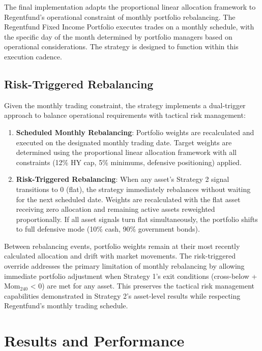 \documentclass[11pt, letterpaper]{article}
\begin{document}
The final implementation adapts the proportional linear allocation framework to Regentfund's operational constraint of monthly portfolio rebalancing. The Regentfund Fixed Income Portfolio executes trades on a monthly schedule, with the specific day of the month determined by portfolio managers based on operational considerations. The strategy is designed to function within this execution cadence.

\subsection{Risk-Triggered Rebalancing}

Given the monthly trading constraint, the strategy implements a dual-trigger approach to balance operational requirements with tactical risk management:

\begin{enumerate}
    \item \textbf{Scheduled Monthly Rebalancing}: Portfolio weights are recalculated and executed on the designated monthly trading date. Target weights are determined using the proportional linear allocation framework with all constraints (12\% HY cap, 5\% minimums, defensive positioning) applied.

    \item \textbf{Risk-Triggered Rebalancing}: When any asset's Strategy 2 signal transitions to 0 (flat), the strategy immediately rebalances without waiting for the next scheduled date. Weights are recalculated with the flat asset receiving zero allocation and remaining active assets reweighted proportionally. If all asset signals turn flat simultaneously, the portfolio shifts to full defensive mode (10\% cash, 90\% government bonds).
\end{enumerate}

Between rebalancing events, portfolio weights remain at their most recently calculated allocation and drift with market movements. The risk-triggered override addresses the primary limitation of monthly rebalancing by allowing immediate portfolio adjustment when Strategy 1's exit conditions (cross-below + Mom$_{240}$ < 0) are met for any asset. This preserves the tactical risk management capabilities demonstrated in Strategy 2's asset-level results while respecting Regentfund's monthly trading schedule.

\newpage
\section{Results and Performance}
\end{document}
